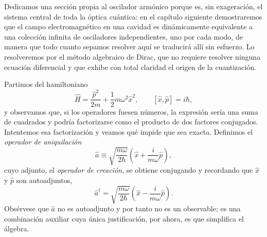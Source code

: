     Dedicamos una sección propia al oscilador armónico porque es, sin exageración, el sistema central de toda la óptica cuántica: en el capítulo siguiente demostraremos que el campo electromagnético en una cavidad es dinámicamente equivalente a una colección infinita de osciladores independientes, uno por cada modo, de manera que todo cuanto sepamos resolver aquí se traducirá allí sin esfuerzo. Lo resolveremos por el método algebraico de Dirac, que no requiere resolver ninguna ecuación diferencial y que exhibe con total claridad el origen de la cuantización.

        Partimos del hamiltoniano
        \begin{equation}\label{eq:HamiltonianoOscQ}
            \hat{H} = \frac{\hat{p}^{2}}{2m} + \frac{1}{2}m\omega^{2}\hat{x}^{2},
            \qquad
            \left[\hat{x},\hat{p}\right] = i\hbar,
        \end{equation}
        y observamos que, si los operadores fuesen números, la expresión sería una suma de cuadrados y podría factorizarse como el producto de dos factores conjugados. Intentemos esa factorización y veamos qué impide que sea exacta. Definimos el \textit{operador de aniquilación}
        \begin{equation}\label{eq:DefinicionA}
            \hat{a} \equiv \sqrt{\frac{m\omega}{2\hbar}}\left(\hat{x} + \frac{i}{m\omega}\hat{p}\right),
        \end{equation}
        cuyo adjunto, el \textit{operador de creación}, se obtiene conjugando y recordando que $\hat{x}$ y $\hat{p}$ son autoadjuntos,
        \begin{equation}\label{eq:DefinicionADaga}
            \hat{a}^{\dagger} = \sqrt{\frac{m\omega}{2\hbar}}\left(\hat{x} - \frac{i}{m\omega}\hat{p}\right).
        \end{equation}
        Obsérvese que $\hat{a}$ no es autoadjunto y por tanto no es un observable; es una combinación auxiliar cuya única justificación, por ahora, es que simplifica el álgebra.

